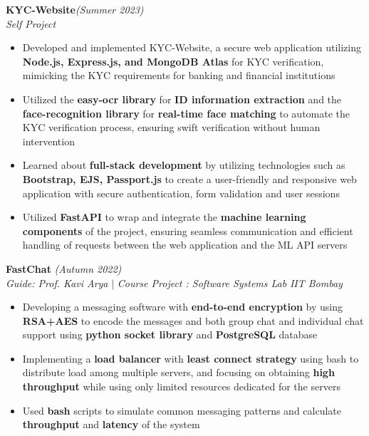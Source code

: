 \documentclass[a4paper,10pt]{article}
\begin{document}
\pagebreak
{}
\vspace{\baselineskip}
\vspace{-15pt}
\noindent\textbf{\large KYC-Website}\hfill{\sl \small (Summer 2023)}\\
{\it Self Project}
\\\vspace{-15pt}
\begin{itemize}[itemsep = -0.65 mm, leftmargin=*]
    \item Developed and implemented KYC-Website, a secure web application utilizing \textbf{Node.js, Express.js, and MongoDB Atlas} for KYC verification, mimicking the KYC requirements for banking and financial institutions
    \item Utilized the \textbf{easy-ocr library} for \textbf{ID information extraction} and the \textbf{face-recognition library} for \textbf{real-time face matching} to automate the KYC verification process, ensuring swift verification without human intervention
    \item Learned about \textbf{full-stack development} by utilizing technologies such as \textbf{Bootstrap, EJS, Passport.js} to create a user-friendly and responsive web application with secure authentication, form validation and user sessions
    \item Utilized \textbf{FastAPI} to wrap and integrate the \textbf{machine learning components} of the project, ensuring seamless communication and efficient handling of requests between the web application and the ML API servers
\end{itemize}
\vspace{\baselineskip}
\vspace{-15pt}
\noindent\textbf{\large FastChat} \hfill{\sl \small (Autumn 2022)}\\
{\it Guide: Prof. Kavi Arya} $|$ {\it Course Project : Software Systems Lab } \hfill{\it IIT Bombay}\\
\vspace{-15pt}
\begin{itemize}[itemsep = -0.65 mm, leftmargin=*]
    \item Developing a messaging software with \textbf{end-to-end encryption} by using \textbf{RSA+AES} to encode the messages and both group chat and individual chat support using \textbf{python socket library} and \textbf{PostgreSQL} database
    \item Implementing a \textbf{load balancer} with \textbf{least connect strategy} using bash to distribute load among multiple servers, and focusing on obtaining \textbf{high throughput} while using only limited resources dedicated for the servers
    \item Used \textbf{bash} scripts to simulate common messaging patterns and calculate \textbf{throughput} and \textbf{latency} of the system
\end{itemize}
\end{document}
